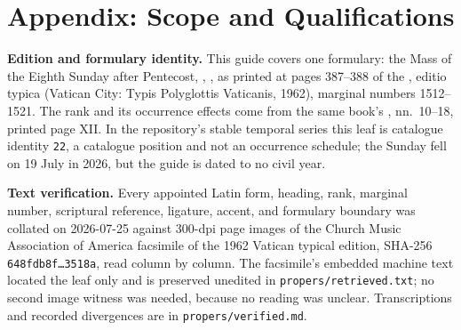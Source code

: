 \section{Appendix: Scope and Qualifications}
\vspace{-0.6em}
\begingroup
\setlength{\parskip}{0.3em}%

\textbf{Edition and formulary identity.} This guide covers one formulary: the
Mass of the Eighth Sunday after Pentecost, , , as printed at pages 387--388 of the
, editio typica (Vatican City: Typis Polyglottis
Vaticanis, 1962), marginal numbers 1512--1521. The rank and its occurrence
effects come from the same book's , nn.\ 10--18,
printed page XII. In the repository's stable temporal series this leaf is
catalogue identity \texttt{22}, a catalogue position and not an occurrence
schedule; the Sunday fell on 19 July in 2026, but the guide is dated to no civil
year.

\textbf{Text verification.} Every appointed Latin form, heading, rank, marginal
number, scriptural reference, ligature, accent, and formulary boundary was
collated on 2026-07-25 against 300-dpi page images of the Church Music
Association of America facsimile of the 1962 Vatican typical edition, SHA-256
\texttt{648fdb8f\dots3518a}, read column by column. The facsimile's embedded
machine text located the leaf only and is preserved unedited in
\texttt{propers/retrieved.txt}; no second image witness was needed, because no
reading was unclear. Transcriptions and recorded divergences are in
\texttt{propers/verified.md}.

